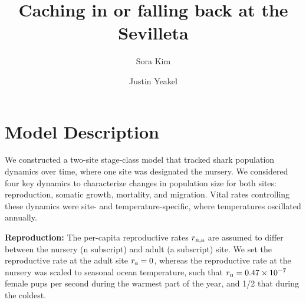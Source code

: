 \documentclass[twocolumn,preprintnumbers,amsmath,amssymb,superscriptaddress]{revtex4}
\begin{document}
\title{Caching in or falling back at the Sevilleta}

\author{Sora Kim} 

\author{Justin Yeakel} 


\maketitle


\section{Model Description}

We constructed a two-site stage-class model that tracked shark population dynamics over time, where one site was designated the nursery.
We considered four key dynamics to characterize changes in population size for both sites: reproduction, somatic growth, mortality, and migration.
Vital rates controlling these dynamics were site- and temperature-specific, where temperatures oscillated annually.

\noindent \textbf{Reproduction:} The per-capita reproductive rates $r_{\rm n,a}$ are assumed to differ between the nursery (n subscript) and adult (a subscript) site.
We set the reproductive rate at the adult site $r_{\rm a} = 0$, whereas the reproductive rate at the nursery was scaled to seasonal ocean temperature, such that $r_{\rm n} = 0.47 \times 10^{-7}$ female pups per second during the warmest part of the year, and 1/2 that during the coldest. 
\end{document}

